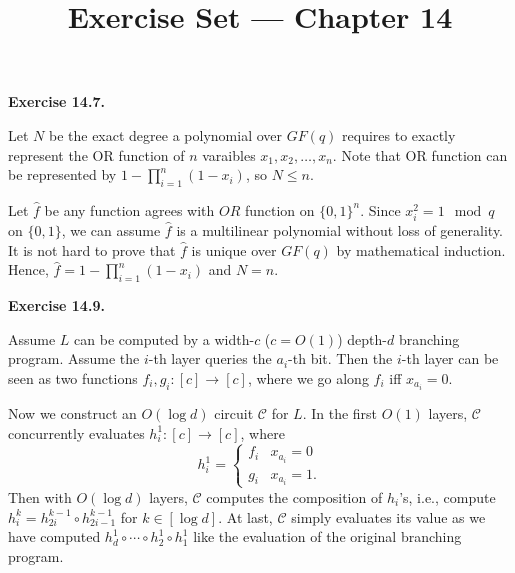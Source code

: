 \documentclass[a4paper]{article}
\title{Exercise Set --- Chapter 14}
\date{}
\newenvironment{exercise}[1]{
	\par
	\noindent\textbf{Exercise #1.}\quad
}{
	\par
	\bigskip
}
\begin{document}
    \maketitle
    \begin{exercise}{14.7}
        Let $N$ be the exact degree a polynomial over $GF(q)$ requires to exactly represent the OR function of $n$ varaibles $x_1,x_2,\dots,x_n $. Note that OR function can be represented by $1-\prod _{i=1}^n (1-x_i)$, so $N \leq n$. 
      
        Let $\hat{f}$ be any function agrees with $OR$ function on $\{0,1\}^n$. Since $x_i^2 =1 \mod q$ on $\{0,1\}$, we can assume $\hat{f}$ is a multilinear polynomial without loss of generality. It is not hard to prove that $\hat{f}$ is unique over $GF(q)$ by mathematical induction. Hence, $\hat{f}=1-\prod _{i=1}^n (1-x_i)$ and $N=n$.
    \end{exercise}

    \begin{exercise}{14.9}
        Assume $L$ can be computed by a width-$c$ ($c=O(1)$) depth-$d$ branching program. 
        Assume the $i$-th layer queries the $a_i$-th bit. Then the $i$-th layer can be seen as two functions 
        $f_i,g_i:[c]\to[c]$, where we go along $f_i$ iff $x_{a_i}=0$.

        Now we construct an $O(\log d)$ circuit $\mathcal C$ for $L$. In the first $O(1)$ layers, $\mathcal C$ concurrently evaluates
        $h_i^1:[c]\to[c]$, where 
        $$
        h_i^1=\begin{cases}
            f_i&x_{a_i}=0\\
            g_i&x_{a_i}=1.
        \end{cases}
        $$
        Then with $O(\log d)$ layers, $\mathcal C$ computes the composition of $h_i$'s, i.e., compute
        $h_i^k=h_{2i}^{k-1}\circ h_{2i-1}^{k-1}$ for $k\in[\log d]$.
        At last, $\mathcal C$ simply evaluates its value as we have computed $h_d^1\circ\cdots\circ h_2^1\circ h_1^1$ like the evaluation of the original branching program.
    \end{exercise}
\end{document}
